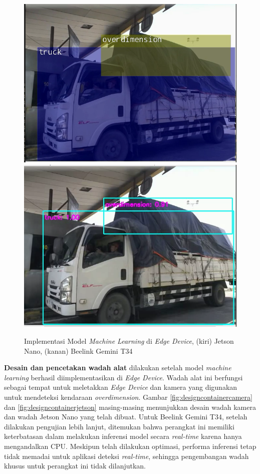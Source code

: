 \begin{figure}[htbp]
  \centering

  \includegraphics[scale=0.3]{gambar/bab3-implementasi-di-jetson.png}
  \includegraphics[scale=0.3]{gambar/bab3-implementasi-di-beelink.png}

  \caption{\centering Implementasi Model \emph{Machine Learning} di \emph{Edge Device}, (kiri) Jetson Nano, (kanan) Beelink Gemini T34}
  \label{fig:implementationedgedevice}
\end{figure}

\textbf{Desain dan pencetakan wadah alat} dilakukan setelah model \emph{machine learning} berhasil diimplementasikan di \emph{Edge Device}. Wadah alat ini berfungsi sebagai tempat untuk meletakkan \emph{Edge Device} dan kamera yang digunakan untuk mendeteksi kendaraan \emph{overdimension}. Gambar \ref{fig:designcontainercamera} dan \ref{fig:designcontainerjetson} masing-masing menunjukkan desain wadah kamera dan wadah Jetson Nano yang telah dibuat. Untuk Beelink Gemini T34, setelah dilakukan pengujian lebih lanjut, ditemukan bahwa perangkat ini memiliki keterbatasan dalam melakukan inferensi model secara \emph{real-time} karena hanya mengandalkan CPU. Meskipun telah dilakukan optimasi, performa inferensi tetap tidak memadai untuk aplikasi deteksi \emph{real-time}, sehingga pengembangan wadah khusus untuk perangkat ini tidak dilanjutkan.

